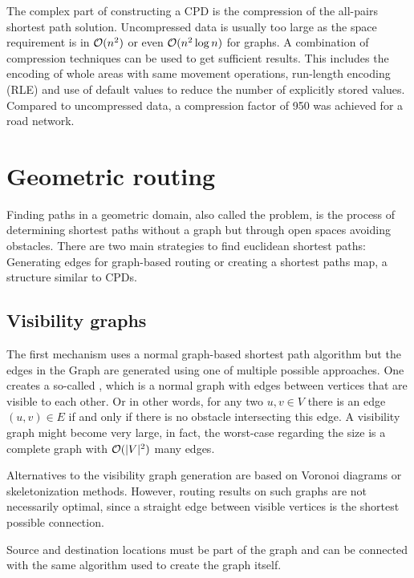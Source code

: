 			The complex part of constructing a CPD is the compression\cite{botea-cpd-2013} of the all-pairs shortest path solution.
			Uncompressed data is usually too large as the space requirement is in $\mathcal{O}(n^2)$ or even $\mathcal{O}(n^2 \log n)$ for graphs.
			A combination of compression techniques can be used to get sufficient results.
			This includes the encoding of whole areas with same movement operations, run-length encoding (RLE) and use of default values to reduce the number of explicitly stored values\cite{botea-cpd-2013}.
			Compared to uncompressed data, a compression factor of 950 was achieved for a road network.
	
\section{Geometric routing}
\label{sec:geometric-routing}

	Finding paths in a geometric domain, also called the  problem, is the process of determining shortest paths without a graph but through open spaces avoiding obstacles.
	There are two main strategies to find euclidean shortest paths:
	Generating edges for graph-based routing or creating a shortest paths map, a structure similar to CPDs.
	
	\subsection{Visibility graphs}
	\label{subsec:visibility-graph}
	
		The first mechanism uses a normal graph-based shortest path algorithm but the edges in the Graph are generated using one of multiple possible approaches.
		One creates a so-called , which is a normal graph with edges between vertices that are visible to each other.
		Or in other words, for any two $u, v \in V$ there is an edge $(u, v) \in E$ if and only if there is no obstacle intersecting this edge.
		A visibility graph might become very large, in fact, the worst-case regarding the size is a complete graph with $\mathcal{O}(|V|^2)$ many edges.
		
		Alternatives to the visibility graph generation are based on Voronoi diagrams or skeletonization methods.
		However, routing results on such graphs are not necessarily optimal\cite{graser-osm-open-spaces}, since a straight edge between visible vertices is the shortest possible connection.
		
		Source and destination locations must be part of the graph and can be connected with the same algorithm used to create the graph itself.
	
